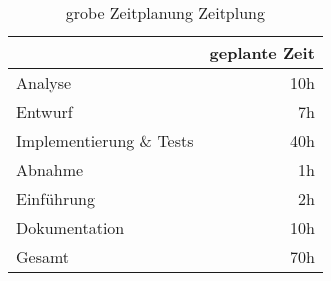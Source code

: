 \begin{table}[h]
\centering
\begin{tabular}{lr}
\rowcolor{gragreen}\multicolumn{1}{l}{\bf{Projektphase}}  & \multicolumn{1}{l}{\bf{geplante Zeit}} \\
\hline
Analyse   & 10h \\

\rowcolor{odd}Entwurf   & 7h \\

Implementierung \& Tests &  40h \\

\rowcolor{odd}Abnahme &   1h \\
Einführung   & 2h \\
\rowcolor{odd}Dokumentation   & 10h \\

\hline
\rowcolor{heading}Gesamt  & 70h
\end{tabular}
\caption{grobe Zeitplanung Zeitplung}
\label{table:overviewtimetable}
\end{table}